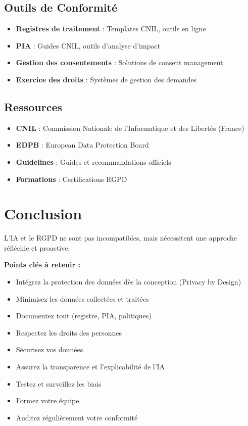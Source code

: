 \documentclass[11pt,a4paper]{article}
\begin{document}
\subsection{Outils de Conformité}

\begin{itemize}
    \item \textbf{Registres de traitement} : Templates CNIL, outils en ligne
    \item \textbf{PIA} : Guides CNIL, outils d'analyse d'impact
    \item \textbf{Gestion des consentements} : Solutions de consent management
    \item \textbf{Exercice des droits} : Systèmes de gestion des demandes
\end{itemize}

\subsection{Ressources}

\begin{itemize}
    \item \textbf{CNIL} : Commission Nationale de l'Informatique et des Libertés (France)
    \item \textbf{EDPB} : European Data Protection Board
    \item \textbf{Guidelines} : Guides et recommandations officiels
    \item \textbf{Formations} : Certifications RGPD
\end{itemize}

\section{Conclusion}

L'IA et le RGPD ne sont pas incompatibles, mais nécessitent une approche réfléchie et proactive. 

\textbf{Points clés à retenir :}
\begin{itemize}
    \item Intégrez la protection des données dès la conception (Privacy by Design)
    \item Minimisez les données collectées et traitées
    \item Documentez tout (registre, PIA, politiques)
    \item Respectez les droits des personnes
    \item Sécurisez vos données
    \item Assurez la transparence et l'explicabilité de l'IA
    \item Testez et surveillez les biais
    \item Formez votre équipe
    \item Auditez régulièrement votre conformité
\end{itemize}
\end{document}
